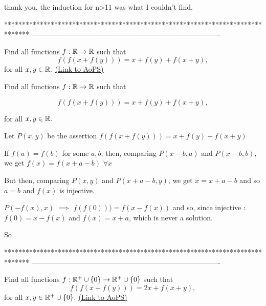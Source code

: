 


\begin{solution}
	thank you. the induction for n>11 was what I couldn't find.
\end{solution}
*******************************************************************************
-------------------------------------------------------------------------------

\begin{problem}
	Find all functions $f:\Bbb{R}\to \Bbb{R}$ such that 
\[f(f(x+f(y)))=x+f(y)+f(x+y), \]
for all $x,y \in \Bbb{R}.$
	\flushright \href{https://artofproblemsolving.com/community/c6h444696}{(Link to AoPS)}
\end{problem}



\begin{solution}
	\begin{tcolorbox}Find all functions $f:\Bbb{R}\to \Bbb{R}$ such that 

\[f(f(x+f(y)))=x+f(y)+f(x+y), \]

for all $x,y \in \Bbb{R}.$\end{tcolorbox}
Let $P(x,y)$ be the assertion $f(f(x+f(y)))=x+f(y)+f(x+y)$

If $f(a)=f(b)$ for some $a,b$, then, comparing $P(x-b,a)$ and $P(x-b,b)$, we get $f(x)=f(x+a-b)$ $\forall x$

But then, comparing $P(x,y)$ and $P(x+a-b,y)$, we get $x=x+a-b$ and so $a=b$ and $f(x)$ is injective.

$P(-f(x),x)$ $\implies$ $f(f(0)))=f(x-f(x))$ and so, since injective : $f(0)=x-f(x)$ and $f(x)=x+a$, which is never a solution.

So
\end{solution}
*******************************************************************************
-------------------------------------------------------------------------------

\begin{problem}
	Find all functions $f:\Bbb{R}^+\cup\{0\}\to \Bbb{R}^+\cup\{0\}$ such that 
\[f(f(x+f(y)))=2x+f(x+y), \]
for all $x,y \in \Bbb{R}^+\cup\{0\}.$
	\flushright \href{https://artofproblemsolving.com/community/c6h444697}{(Link to AoPS)}
\end{problem}



